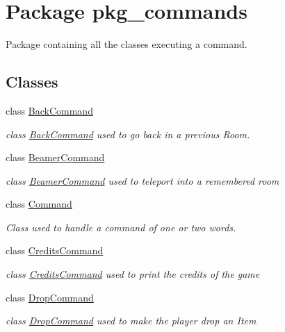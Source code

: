 \hypertarget{namespacepkg__commands}{\section{Package pkg\-\_\-commands}
\label{namespacepkg__commands}
}


Package containing all the classes executing a command.  


\subsection*{Classes}
\begin{DoxyCompactItemize}
\item 
class \hyperlink{classpkg__commands_1_1BackCommand}{Back\-Command}
\begin{DoxyCompactList}\small\item\em class \hyperlink{classpkg__commands_1_1BackCommand}{Back\-Command} used to go back in a previous Room. \end{DoxyCompactList}\item 
class \hyperlink{classpkg__commands_1_1BeamerCommand}{Beamer\-Command}
\begin{DoxyCompactList}\small\item\em class \hyperlink{classpkg__commands_1_1BeamerCommand}{Beamer\-Command} used to teleport into a remembered room \end{DoxyCompactList}\item 
class \hyperlink{classpkg__commands_1_1Command}{Command}
\begin{DoxyCompactList}\small\item\em Class used to handle a command of one or two words. \end{DoxyCompactList}\item 
class \hyperlink{classpkg__commands_1_1CreditsCommand}{Credits\-Command}
\begin{DoxyCompactList}\small\item\em class \hyperlink{classpkg__commands_1_1CreditsCommand}{Credits\-Command} used to print the credits of the game \end{DoxyCompactList}\item 
class \hyperlink{classpkg__commands_1_1DropCommand}{Drop\-Command}
\begin{DoxyCompactList}\small\item\em class \hyperlink{classpkg__commands_1_1DropCommand}{Drop\-Command} used to make the player drop an Item \end{DoxyCompactList}\item 

\end{DoxyCompactItemize}
